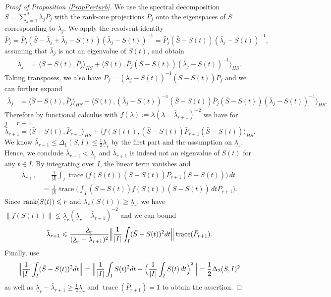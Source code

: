 \documentclass[preprint,aos]{imsart}
\numberwithin{equation}{section}
\theoremstyle{remark}
\DeclareMathOperator{\trace}{trace}
\providecommand{\abs}[1]{\lvert #1 \rvert}
\providecommand{\norm}[1]{\lVert #1 \rVert}
\providecommand{\bnorm}[1]{{\Bigl\lVert #1 \Bigr\rVert}}
\providecommand{\scapro}[2]{\langle #1,#2 \rangle}
\renewcommand{\le}{\leqslant}
\renewcommand{\ge}{\geqslant}
\begin{document}
\begin{appendix}
\begin{proof}[Proof of Proposition \ref{PropPerturb}]
We use the spectral decomposition  $\bar S =\sum_{j=1}^d\bar\lambda_j\bar P_j$ with the rank-one projections $\bar P_j$ onto the eigenspaces of $\bar S$ corresponding to $\bar\lambda_j$. We apply the resolvent identity
\[\bar P_j=\bar P_j(\bar S- \bar\lambda_j +\bar\lambda_j-S(t))(\bar\lambda_j-S(t))^{-1}=\bar P_j(\bar S-S(t))(\bar\lambda_j-S(t))^{-1},\]
assuming that $\bar\lambda_{j}$ is not an eigenvalue of $S(t)$, and obtain
\begin{align*}
\bar\lambda_{j}&=\scapro{\bar S-S(t)}{\bar P_{j}}_{HS}+\scapro{S(t)}{\bar P_{j}(\bar S-S(t))(\bar\lambda_{j}-S(t))^{-1}}_{HS}.
\end{align*}
Taking transposes, we also have $\bar P_j=(\bar\lambda_j-S(t))^{-1}(\bar S-S(t))\bar P_j$ and we can further expand
\begin{align}\label{EqQuadrPert}
\bar\lambda_{j}&=\scapro{\bar S-S(t)}{\bar P_{j}}_{HS}+\scapro{S(t)}{(\bar\lambda_{j}-S(t))^{-1}(\bar S-S(t))\bar P_{j}(\bar S-S(t))(\bar\lambda_{j}-S(t))^{-1}}_{HS}.
\end{align}
Therefore by functional calculus with $f(\lambda):=\lambda(\lambda-\bar\lambda_{r+1})^{-2}$ we have for $j=r+1$
\[ \bar\lambda_{r+1}=\scapro{\bar S-S(t)}{\bar P_{r+1}}_{HS}+\scapro{f(S(t))}{(\bar S-S(t))\bar P_{r+1}(\bar S-S(t))}_{HS}.
\]
We know $\bar \lambda_{r+1}\le \Delta_1(S,I)\le  \frac12\underline\lambda_r$  by the first part and the assumption on $\underline\lambda_r$. Hence, we conclude $\bar \lambda_{r+1}<\underline\lambda_r$ and $\bar \lambda_{r+1}$ is indeed not an eigenvalue of $S(t)$ for any $t\in I$.
By integrating over $I$, the linear term vanishes and
\begin{align*}
\bar\lambda_{r+1} &=\frac1{\abs{I}}\int_I \trace\Big(f(S(t))(\bar S-S(t))\bar P_{r+1}(\bar S-S(t))\Big)\,dt\\
 &=\frac1{\abs{I}} \trace\Big(\int_I(\bar S-S(t))f(S(t))(\bar S-S(t))\,dt\bar P_{r+1}\Big).
\end{align*}
Since $\rank(S(t))\le r$ and $\lambda_r(S(t))\ge\underline\lambda_r$, we have $\norm{f(S(t))}\le \underline\lambda_r(\underline\lambda_r-\bar\lambda_{r+1})^{-2}$ and we can bound
\[ \bar\lambda_{r+1}\le \frac{\underline\lambda_r}{(\underline\lambda_r-\bar \lambda_{r+1})^2}\bnorm{\frac1{\abs{I}}\int_I (\bar S-S(t))^2dt} \trace(\bar P_{r+1}).
\]
Finally, use
\[ \bnorm{\frac1{\abs{I}}\int_I (\bar S-S(t))^2dt}=\bnorm{\frac1{\abs{I}}\int_I S(t)^2dt-\Big(\frac1{\abs{I}}\int_I S(t)\,dt\Big)^2}=\frac12\Delta_2(S,I)^2
\]
as well as $\underline\lambda_r-\bar \lambda_{r+1}\ge \frac12\underline\lambda_r$ and $\trace(\bar P_{r+1})=1$ to obtain the  assertion.
\end{proof}




\end{appendix}
\end{document}
